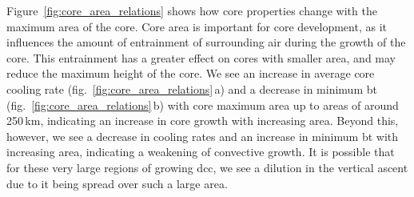 Figure~\ref{fig:core_area_relations} shows how core properties change with the maximum area of the core.
Core area is important for core development, as it influences the amount of entrainment of surrounding air during the growth of the core.
This entrainment has a greater effect on cores with smaller area, and may reduce the maximum height of the core.
We see an increase in average core cooling rate (fig.~\ref{fig:core_area_relations}\,a) and a decrease in minimum \acrshort{bt} (fig.~\ref{fig:core_area_relations}\,b) with core maximum area up to areas of around 250\,\unit{km}, indicating an increase in core growth with increasing area.
Beyond this, however, we see a decrease in cooling rates and an increase in minimum \acrshort{bt} with increasing area, indicating a weakening of convective growth.
It is possible that for these very large regions of growing \acrshort{dcc}, we see a dilution in the vertical ascent due to it being spread over such a large area.



